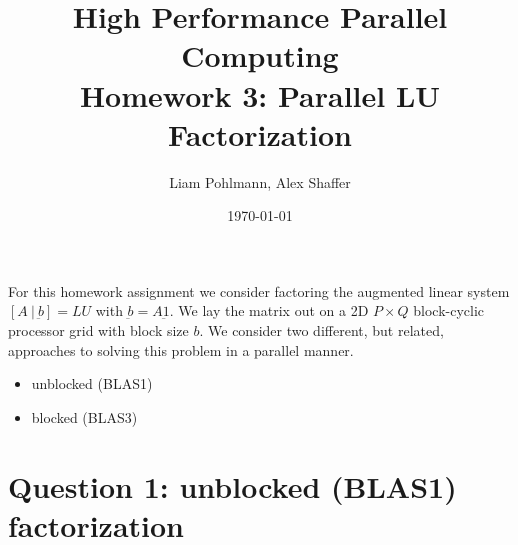 \documentclass[11pt]{article}
\title{\textbf{High Performance Parallel Computing \\ Homework 3: Parallel LU Factorization}}
\author{Liam Pohlmann, Alex Shaffer}
\date{\today}
\begin{document}
\maketitle


For this homework assignment we consider factoring the augmented linear system $[A \ | \ \underbar{b}] = LU$ with $\underbar{b} = A\underbar{1}$.
We lay the matrix out on a 2D $P \times Q$ block-cyclic processor grid with block size $b$.
We consider two different, but related, approaches to solving this problem in a parallel manner. 

\begin{itemize}
    \item unblocked (BLAS1)
    \item blocked (BLAS3)
\end{itemize}


\section*{Question 1: unblocked (BLAS1) factorization}
\end{document}
